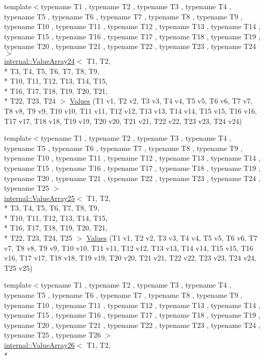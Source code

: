 \begin{DoxyCompactItemize}
{\footnotesize template$<$typename T1 , typename T2 , typename T3 , typename T4 , typename T5 , typename T6 , typename T7 , typename T8 , typename T9 , typename T10 , typename T11 , typename T12 , typename T13 , typename T14 , typename T15 , typename T16 , typename T17 , typename T18 , typename T19 , typename T20 , typename T21 , typename T22 , typename T23 , typename T24 $>$ }\\\hyperlink{classtesting_1_1internal_1_1_value_array24}{internal\-::\-Value\-Array24}$<$ T1, T2, \\*
T3, T4, T5, T6, T7, T8, T9, \\*
T10, T11, T12, T13, T14, T15, \\*
T16, T17, T18, T19, T20, T21, \\*
T22, T23, T24 $>$ \hyperlink{namespacetesting_a74b2375fe8c3c685e6f7b0b6a9b61009}{Values} (T1 v1, T2 v2, T3 v3, T4 v4, T5 v5, T6 v6, T7 v7, T8 v8, T9 v9, T10 v10, T11 v11, T12 v12, T13 v13, T14 v14, T15 v15, T16 v16, T17 v17, T18 v18, T19 v19, T20 v20, T21 v21, T22 v22, T23 v23, T24 v24)
\item 
{\footnotesize template$<$typename T1 , typename T2 , typename T3 , typename T4 , typename T5 , typename T6 , typename T7 , typename T8 , typename T9 , typename T10 , typename T11 , typename T12 , typename T13 , typename T14 , typename T15 , typename T16 , typename T17 , typename T18 , typename T19 , typename T20 , typename T21 , typename T22 , typename T23 , typename T24 , typename T25 $>$ }\\\hyperlink{classtesting_1_1internal_1_1_value_array25}{internal\-::\-Value\-Array25}$<$ T1, T2, \\*
T3, T4, T5, T6, T7, T8, T9, \\*
T10, T11, T12, T13, T14, T15, \\*
T16, T17, T18, T19, T20, T21, \\*
T22, T23, T24, T25 $>$ \hyperlink{namespacetesting_a74baf6524bda9b5799e313541b4816ea}{Values} (T1 v1, T2 v2, T3 v3, T4 v4, T5 v5, T6 v6, T7 v7, T8 v8, T9 v9, T10 v10, T11 v11, T12 v12, T13 v13, T14 v14, T15 v15, T16 v16, T17 v17, T18 v18, T19 v19, T20 v20, T21 v21, T22 v22, T23 v23, T24 v24, T25 v25)
\item 
{\footnotesize template$<$typename T1 , typename T2 , typename T3 , typename T4 , typename T5 , typename T6 , typename T7 , typename T8 , typename T9 , typename T10 , typename T11 , typename T12 , typename T13 , typename T14 , typename T15 , typename T16 , typename T17 , typename T18 , typename T19 , typename T20 , typename T21 , typename T22 , typename T23 , typename T24 , typename T25 , typename T26 $>$ }\\\hyperlink{classtesting_1_1internal_1_1_value_array26}{internal\-::\-Value\-Array26}$<$ T1, T2, \\*

\end{DoxyCompactItemize}
